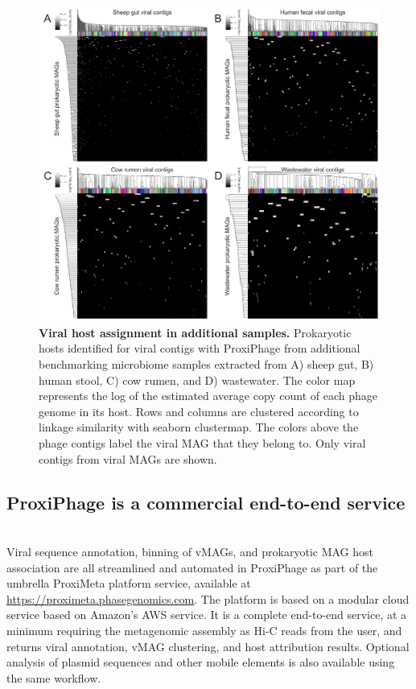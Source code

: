  \begin{figure}[!t]
    \centering
    \includegraphics[width=\textwidth]{Figures/figure_extra_samples_hosts.png}
    \caption{\textbf{Viral host assignment in additional samples.} Prokaryotic hosts identified for viral contigs with ProxiPhage from additional benchmarking microbiome samples extracted from A) sheep gut, B) human stool, C) cow rumen, and D) wastewater. The color map represents the log of the estimated average copy count of each phage genome in its host. Rows and columns are clustered according to linkage similarity with seaborn clustermap. The colors above the phage contigs label the viral MAG that they belong to. Only viral contigs from viral MAGs are shown.}
    \label{fig:figure_extra_samples_hosts}
 \end{figure}


\subsection*{ProxiPhage is a commercial end-to-end service} \hfill\\
    Viral sequence annotation, binning of vMAGs, and prokaryotic MAG host association are all streamlined and automated in ProxiPhage as part of the umbrella ProxiMeta platform service, available at \url{https://proximeta.phasegenomics.com}. The platform is based on a modular cloud service based on Amazon’s AWS service. It is a complete end-to-end service, at a minimum requiring the metagenomic assembly as Hi-C reads from the user, and returns viral annotation, vMAG clustering, and host attribution results. Optional analysis of plasmid sequences and other mobile elements is also available using the same workflow. 


